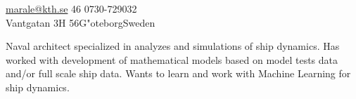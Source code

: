 \documentclass[10pt,a4paper]{article} %
\begin{document}
 



\noindent\href{mailto:marale@kth.se}{marale@kth.se}\bull %
\textsmaller{+}46 0730-729032 %
\\ %
Vantgatan 3H 56\bull G"oteborg\bull Sweden %

\spacedhrule{0.9em}{-0.4em} %



\vspace{-1.3em} %

\setlength\columnsep{30pt}
\begin{multicols}{2}  %

\noindent Naval architect specialized in analyzes and simulations of ship dynamics. Has worked with development of mathematical models based on model tests data and/or full scale ship data. Wants to learn and work with Machine Learning for ship dynamics.

\end{multicols}

\spacedhrule{0.5em}{-0.4em} %


\end{document}
